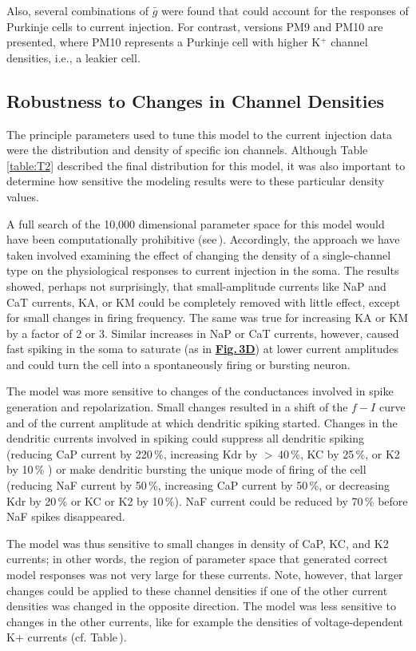 \documentclass[12pt]{article}
\begin{document}
Also, several combinations of $\bar g$ were found that could account for
the responses of Purkinje cells to current injection. For contrast,
versions PM9 and PM10 are presented, where PM10 represents
a Purkinje cell with higher K$^+$ channel densities, i.e., a leakier
cell.

\subsection*{Robustness to Changes in Channel Densities}

The principle parameters used to tune this
model to the current injection data were the distribution
and density of specific ion channels. Although Table\,\ref{table:T2} described
the final distribution for this model, it was also important
to determine how sensitive the modeling results
were to these particular density values.

A full search of the 10,000 dimensional parameter space
for this model would have been computationally prohibitive
(see\,\cite{S:1993dz}). Accordingly, the approach
we have taken involved examining the effect of
changing the density of a single-channel type on the physiological
responses to current injection in the soma. The results
showed, perhaps not surprisingly, that small-amplitude
currents like NaP and CaT currents, KA, or KM could
be completely removed with little effect, except for small
changes in firing frequency. The same was true for increasing
KA or KM by a factor of 2 or 3. Similar increases in
NaP or CaT currents, however, caused fast spiking in the
soma to saturate (as in \href{../pub-purkinje-deschutter1-fig-3/pub-purkinje-deschutter1-fig-3.tex}{\bf Fig.\,3D}) at lower current amplitudes
and could turn the cell into a spontaneously firing or
bursting neuron.

The model was more sensitive to changes of the conductances
involved in spike generation and repolarization.
Small changes resulted in a shift of the $f-I$ curve and of the
current amplitude at which dendritic spiking started.
Changes in the dendritic currents involved in spiking could
suppress all dendritic spiking (reducing CaP current by
220\,\%, increasing Kdr by $>$\,40\,\%, KC by 25\,\%, or K2 by
10\,\% ) or make dendritic bursting the unique mode of firing
of the cell (reducing NaF current by 50\,\%, increasing CaP
current by 50\,\%, or decreasing Kdr by 20\,\% or KC or K2 by
10\,\%). NaF current could be reduced by 70\,\% before NaF
spikes disappeared.

The model was thus sensitive to small changes in density
of CaP, KC, and K2 currents; in other words, the region of
parameter space that generated correct model responses
was not very large for these currents. Note, however, that
larger changes could be applied to these channel densities if
one of the other current densities was changed in the opposite
direction. The model was less sensitive to changes in the
other currents, like for example the densities of voltage-dependent
K+ currents (cf. Table\,\cite{table:T2}).
\end{document}
